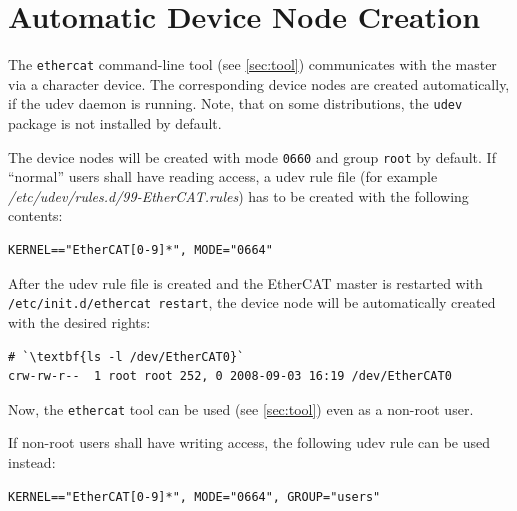 \documentclass[a4paper,12pt,BCOR=6mm,bibtotoc,idxtotoc]{scrbook}
\begin{document}
\section{Automatic Device Node Creation}
\label{sec:autonode}

The \lstinline+ethercat+ command-line tool (see \autoref{sec:tool})
communicates with the master via a character device. The corresponding device
nodes are created automatically, if the udev daemon is running.  Note, that on
some distributions, the \lstinline+udev+ package is not installed by default.

The device nodes will be created with mode \lstinline+0660+ and group
\lstinline+root+ by default. If ``normal'' users shall have reading access, a
udev rule file (for example \textit{/etc/udev/rules.d/99-EtherCAT.rules}) has
to be created with the following contents:

\begin{lstlisting}
KERNEL=="EtherCAT[0-9]*", MODE="0664"
\end{lstlisting}

After the udev rule file is created and the EtherCAT master is restarted with
\lstinline[breaklines=true]+/etc/init.d/ethercat restart+, the device node
will be automatically created with the desired rights:

\begin{lstlisting}
# `\textbf{ls -l /dev/EtherCAT0}`
crw-rw-r--  1 root root 252, 0 2008-09-03 16:19 /dev/EtherCAT0
\end{lstlisting}

Now, the \lstinline+ethercat+ tool can be used (see \autoref{sec:tool}) even
as a non-root user.

If non-root users shall have writing access, the following udev rule can be
used instead:

\begin{lstlisting}
KERNEL=="EtherCAT[0-9]*", MODE="0664", GROUP="users"
\end{lstlisting}

\end{document}
